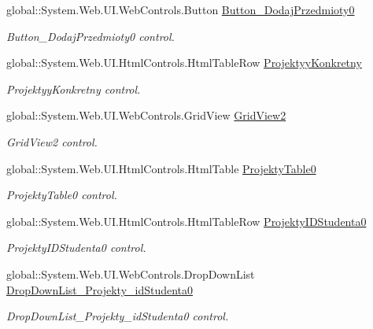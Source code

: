\begin{DoxyCompactItemize}
global\+::\+System.\+Web.\+U\+I.\+Web\+Controls.\+Button \hyperlink{class_dziennik_ocen_web2_1_1_web_form1_a8c864c9ae0eb563508b3b1a87612b8f0}{Button\+\_\+\+Dodaj\+Przedmioty0}
\begin{DoxyCompactList}\small\item\em Button\+\_\+\+Dodaj\+Przedmioty0 control. \end{DoxyCompactList}\item 
global\+::\+System.\+Web.\+U\+I.\+Html\+Controls.\+Html\+Table\+Row \hyperlink{class_dziennik_ocen_web2_1_1_web_form1_a236a0340a0cdd4be0cb04f8231c70c79}{Projektyy\+Konkretny}
\begin{DoxyCompactList}\small\item\em Projektyy\+Konkretny control. \end{DoxyCompactList}\item 
global\+::\+System.\+Web.\+U\+I.\+Web\+Controls.\+Grid\+View \hyperlink{class_dziennik_ocen_web2_1_1_web_form1_a835a3a863f668e7f4d1b9f8d1e82a933}{Grid\+View2}
\begin{DoxyCompactList}\small\item\em Grid\+View2 control. \end{DoxyCompactList}\item 
global\+::\+System.\+Web.\+U\+I.\+Html\+Controls.\+Html\+Table \hyperlink{class_dziennik_ocen_web2_1_1_web_form1_a218e50105cfbf5e9c4c218f1098e2e00}{Projekty\+Table0}
\begin{DoxyCompactList}\small\item\em Projekty\+Table0 control. \end{DoxyCompactList}\item 
global\+::\+System.\+Web.\+U\+I.\+Html\+Controls.\+Html\+Table\+Row \hyperlink{class_dziennik_ocen_web2_1_1_web_form1_a1a4e38055cff20b9c979b9a72608f5d7}{Projekty\+I\+D\+Studenta0}
\begin{DoxyCompactList}\small\item\em Projekty\+I\+D\+Studenta0 control. \end{DoxyCompactList}\item 
global\+::\+System.\+Web.\+U\+I.\+Web\+Controls.\+Drop\+Down\+List \hyperlink{class_dziennik_ocen_web2_1_1_web_form1_a56263d1234f7811a3793deae16255be1}{Drop\+Down\+List\+\_\+\+Projekty\+\_\+id\+Studenta0}
\begin{DoxyCompactList}\small\item\em Drop\+Down\+List\+\_\+\+Projekty\+\_\+id\+Studenta0 control. \end{DoxyCompactList}\item 

\end{DoxyCompactItemize}
